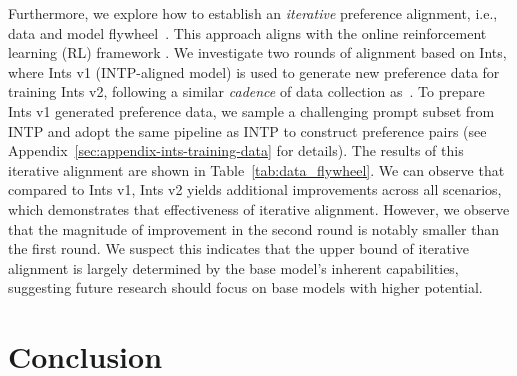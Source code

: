 \documentclass[11pt]{article}
\begin{document}

Furthermore, we explore how to establish an \textit{iterative} preference alignment, i.e., data and model flywheel~\cite{RLHF-anthoropic,llama3,iterative-dpo}. This approach aligns with the online reinforcement learning (RL) framework \citet{li2023rema4}.  We investigate two rounds of alignment based on Ints, where Ints v1 (INTP-aligned model) is used to generate new preference data for training Ints v2, following a similar \textit{cadence} of data collection as~\cite{RLHF-anthoropic}. To prepare Ints v1 generated preference data, we sample a challenging prompt subset from INTP and adopt the same pipeline as INTP to construct preference pairs (see Appendix~\ref{sec:appendix-ints-training-data} for details). The results of this iterative alignment are shown in Table~\ref{tab:data_flywheel}. We can observe that compared to Ints v1, Ints v2 yields additional improvements across all scenarios, which demonstrates that effectiveness of iterative alignment. However, we observe that the magnitude of improvement in the second round is notably smaller than the first round. We suspect this indicates that the upper bound of iterative alignment is largely determined by the base model's inherent capabilities, suggesting future research should focus on base models with higher potential.

\section{Conclusion}
\end{document}
